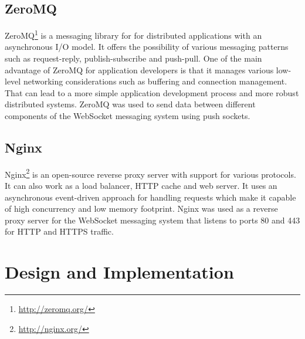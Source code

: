 \subsection{ZeroMQ}

ZeroMQ\footnote{\url{http://zeromq.org/}} is a messaging library for for distributed applications with an asynchronous I/O model. It offers the possibility of various messaging patterns such as request-reply, publish-subscribe and push-pull. One of the main advantage of ZeroMQ for application developers is that it manages various low-level networking considerations such as buffering and connection management. That can lead to a more simple application development process and more robust distributed systems. ZeroMQ was used to send data between different components of the WebSocket messaging system using push sockets.

\subsection{Nginx}

Nginx\footnote{\url{http://nginx.org/}} is an open-source reverse proxy server with support for various protocols. It can also work as a load balancer, HTTP cache and web server. It uses an asynchronous event-driven approach for handling requests which make it capable of high concurrency and low memory footprint. Nginx was used as a reverse proxy server for the WebSocket messaging system that listens to ports 80 and 443 for HTTP and HTTPS traffic.

\section{Design and Implementation}

